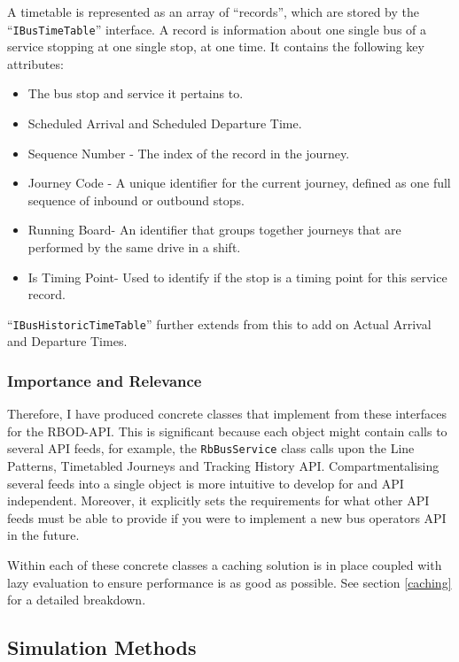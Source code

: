 \documentclass{article}
\begin{document}
A timetable is represented as an array of ``records'', which are stored by the ``\texttt{IBusTimeTable}'' interface. A record is information about one single bus of a service stopping at one single stop, at one time. It contains the following key attributes:

\begin{itemize}
	\item The bus stop and service it pertains to.
	\item Scheduled Arrival and Scheduled Departure Time.
	\item Sequence Number - The index of the record in the journey.
	\item Journey Code - A unique identifier for the current journey, defined as one full sequence of inbound or outbound stops.  
	\item Running Board- An identifier that groups together journeys that are performed by the same drive in a shift.
	\item Is Timing Point- Used to identify if the stop is a timing point for this service record.
\end{itemize}

``\texttt{IBusHistoricTimeTable}'' further extends from this to add on Actual Arrival and Departure Times. 

\subsubsection{Importance and Relevance}
Therefore, I have produced concrete classes that implement from these interfaces for the RBOD-API. This is significant because each object might contain calls to several API feeds, for example, the \texttt{RbBusService} class calls upon the Line Patterns, Timetabled Journeys and Tracking History API. Compartmentalising several feeds into a single object is more intuitive to develop for and API independent. Moreover, it explicitly sets the requirements for what other API feeds must be able to provide if you were to implement a new bus operators API in the future. 

\par 
Within each of these concrete classes a caching solution is in place coupled with lazy evaluation to ensure performance is as good as possible. See section \ref{caching} for a detailed breakdown.



\subsection{Simulation Methods}
\label{simulation}
\end{document}
